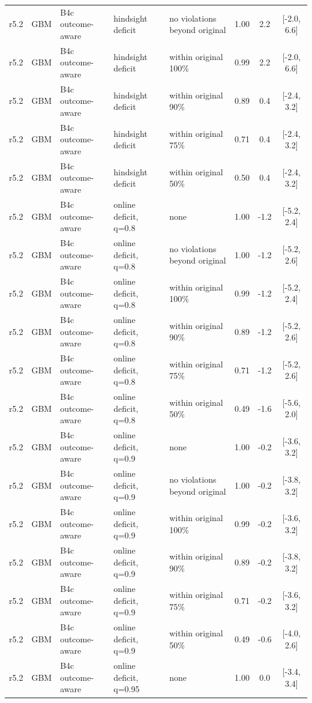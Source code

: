 \documentclass[10pt,onecolumn,letterpaper]{article}
\begin{document}
\begin{longtable}{lllp{4.2cm}p{3.4cm}ccc}
r5.2 & GBM & B4c outcome-aware & hindsight deficit & no violations beyond original & 1.00 & 2.2 & [-2.0, 6.6] \\
r5.2 & GBM & B4c outcome-aware & hindsight deficit & within original 100\% & 0.99 & 2.2 & [-2.0, 6.6] \\
r5.2 & GBM & B4c outcome-aware & hindsight deficit & within original 90\% & 0.89 & 0.4 & [-2.4, 3.2] \\
r5.2 & GBM & B4c outcome-aware & hindsight deficit & within original 75\% & 0.71 & 0.4 & [-2.4, 3.2] \\
r5.2 & GBM & B4c outcome-aware & hindsight deficit & within original 50\% & 0.50 & 0.4 & [-2.4, 3.2] \\
r5.2 & GBM & B4c outcome-aware & online deficit, q=0.8 & none & 1.00 & -1.2 & [-5.2, 2.4] \\
r5.2 & GBM & B4c outcome-aware & online deficit, q=0.8 & no violations beyond original & 1.00 & -1.2 & [-5.2, 2.6] \\
r5.2 & GBM & B4c outcome-aware & online deficit, q=0.8 & within original 100\% & 0.99 & -1.2 & [-5.2, 2.4] \\
r5.2 & GBM & B4c outcome-aware & online deficit, q=0.8 & within original 90\% & 0.89 & -1.2 & [-5.2, 2.6] \\
r5.2 & GBM & B4c outcome-aware & online deficit, q=0.8 & within original 75\% & 0.71 & -1.2 & [-5.2, 2.6] \\
r5.2 & GBM & B4c outcome-aware & online deficit, q=0.8 & within original 50\% & 0.49 & -1.6 & [-5.6, 2.0] \\
r5.2 & GBM & B4c outcome-aware & online deficit, q=0.9 & none & 1.00 & -0.2 & [-3.6, 3.2] \\
r5.2 & GBM & B4c outcome-aware & online deficit, q=0.9 & no violations beyond original & 1.00 & -0.2 & [-3.8, 3.2] \\
r5.2 & GBM & B4c outcome-aware & online deficit, q=0.9 & within original 100\% & 0.99 & -0.2 & [-3.6, 3.2] \\
r5.2 & GBM & B4c outcome-aware & online deficit, q=0.9 & within original 90\% & 0.89 & -0.2 & [-3.8, 3.2] \\
r5.2 & GBM & B4c outcome-aware & online deficit, q=0.9 & within original 75\% & 0.71 & -0.2 & [-3.6, 3.2] \\
r5.2 & GBM & B4c outcome-aware & online deficit, q=0.9 & within original 50\% & 0.49 & -0.6 & [-4.0, 2.6] \\
r5.2 & GBM & B4c outcome-aware & online deficit, q=0.95 & none & 1.00 & 0.0 & [-3.4, 3.4] \\

\end{longtable}
\end{document}
